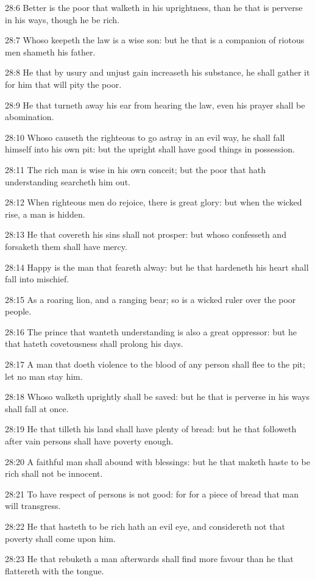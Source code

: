 28:6 Better is the poor that walketh in his uprightness, than he that
is perverse in his ways, though he be rich.

28:7 Whoso keepeth the law is a wise son: but he that is a companion
of riotous men shameth his father.

28:8 He that by usury and unjust gain increaseth his substance, he
shall gather it for him that will pity the poor.

28:9 He that turneth away his ear from hearing the law, even his
prayer shall be abomination.

28:10 Whoso causeth the righteous to go astray in an evil way, he
shall fall himself into his own pit: but the upright shall have good
things in possession.

28:11 The rich man is wise in his own conceit; but the poor that hath
understanding searcheth him out.

28:12 When righteous men do rejoice, there is great glory: but when
the wicked rise, a man is hidden.

28:13 He that covereth his sins shall not prosper: but whoso
confesseth and forsaketh them shall have mercy.

28:14 Happy is the man that feareth alway: but he that hardeneth his
heart shall fall into mischief.

28:15 As a roaring lion, and a ranging bear; so is a wicked ruler over
the poor people.

28:16 The prince that wanteth understanding is also a great oppressor:
but he that hateth covetousness shall prolong his days.

28:17 A man that doeth violence to the blood of any person shall flee
to the pit; let no man stay him.

28:18 Whoso walketh uprightly shall be saved: but he that is perverse
in his ways shall fall at once.

28:19 He that tilleth his land shall have plenty of bread: but he that
followeth after vain persons shall have poverty enough.

28:20 A faithful man shall abound with blessings: but he that maketh
haste to be rich shall not be innocent.

28:21 To have respect of persons is not good: for for a piece of bread
that man will transgress.

28:22 He that hasteth to be rich hath an evil eye, and considereth not
that poverty shall come upon him.

28:23 He that rebuketh a man afterwards shall find more favour than he
that flattereth with the tongue.

